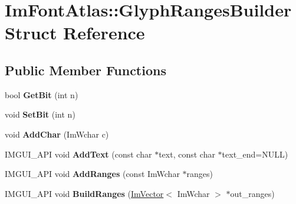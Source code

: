 \hypertarget{struct_im_font_atlas_1_1_glyph_ranges_builder}{}\section{Im\+Font\+Atlas\+:\+:Glyph\+Ranges\+Builder Struct Reference}
\label{struct_im_font_atlas_1_1_glyph_ranges_builder}
\subsection*{Public Member Functions}
\begin{DoxyCompactItemize}
\item 
\mbox{\label{struct_im_font_atlas_1_1_glyph_ranges_builder_a157a4d95c361d717c073d5815d576eb5}} 
bool {\bfseries Get\+Bit} (int n)
\item 
\mbox{\label{struct_im_font_atlas_1_1_glyph_ranges_builder_aff570c016f17c1cd8d3a819b5f7a056c}} 
void {\bfseries Set\+Bit} (int n)
\item 
\mbox{\label{struct_im_font_atlas_1_1_glyph_ranges_builder_a6b6b18e5c5fc4366afc98ff7391ba0bf}} 
void {\bfseries Add\+Char} (Im\+Wchar c)
\item 
\mbox{\label{struct_im_font_atlas_1_1_glyph_ranges_builder_a6c0f9756dc8ea184920d5ff28bfdb669}} 
I\+M\+G\+U\+I\+\_\+\+A\+PI void {\bfseries Add\+Text} (const char $\ast$text, const char $\ast$text\+\_\+end=N\+U\+LL)
\item 
\mbox{\label{struct_im_font_atlas_1_1_glyph_ranges_builder_a93174d62f8cf366528b654806ca7be49}} 
I\+M\+G\+U\+I\+\_\+\+A\+PI void {\bfseries Add\+Ranges} (const Im\+Wchar $\ast$ranges)
\item 
\mbox{\label{struct_im_font_atlas_1_1_glyph_ranges_builder_aa55b5710971adef2e4c690a3e46de6d5}} 
I\+M\+G\+U\+I\+\_\+\+A\+PI void {\bfseries Build\+Ranges} (\hyperlink{class_im_vector}{Im\+Vector}$<$ Im\+Wchar $>$ $\ast$out\+\_\+ranges)
\end{DoxyCompactItemize}
